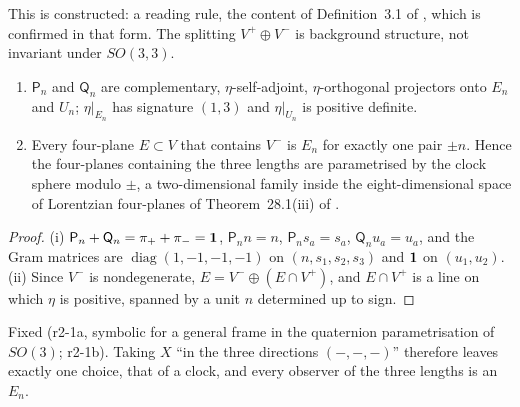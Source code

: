 This is constructed: a reading rule, the content of Definition~3.1 of \cite{FMB}, which is confirmed in that form. The splitting $V^+\oplus V^-$ is
background structure, not invariant under $SO(3,3)$.

\begin{proposition}
\label{r2:prop:planes}
\begin{enumerate}[label=(\roman*),leftmargin=2.2em]
\item $\mathsf P_n$ and $\mathsf Q_n$ are complementary, $\eta$-self-adjoint, $\eta$-orthogonal projectors onto $E_n$ and $U_n$; $\eta|_{E_n}$ has
signature $(1,3)$ and $\eta|_{U_n}$ is positive definite.
\item Every four-plane $E\subset V$ that contains $V^-$ is $E_n$ for exactly one pair $\pm n$. Hence the four-planes containing the three lengths are
parametrised by the clock sphere modulo $\pm$, a two-dimensional family inside the eight-dimensional space of Lorentzian four-planes of
Theorem~28.1(iii) of \cite{ES17}.
\end{enumerate}
\end{proposition}

\begin{proof}
(i) $\mathsf P_n+\mathsf Q_n=\pi_++\pi_-=\mathbf 1$, $\mathsf P_nn=n$, $\mathsf P_ns_a=s_a$, $\mathsf Q_nu_a=u_a$, and the Gram matrices are
$\operatorname{diag}(1,-1,-1,-1)$ on $(n,s_1,s_2,s_3)$ and $\mathbf 1$ on $(u_1,u_2)$. (ii) Since $V^-$ is nondegenerate, $E=V^-\oplus(E\cap V^+)$, and
$E\cap V^+$ is a line on which $\eta$ is positive, spanned by a unit $n$ determined up to sign.
\end{proof}

Fixed (r2-1a, symbolic for a general frame in the quaternion parametrisation of $SO(3)$; r2-1b). Taking $X$ ``in the three directions $(-,-,-)$''
therefore leaves exactly one choice, that of a clock, and every observer of the three lengths is an $E_n$.

